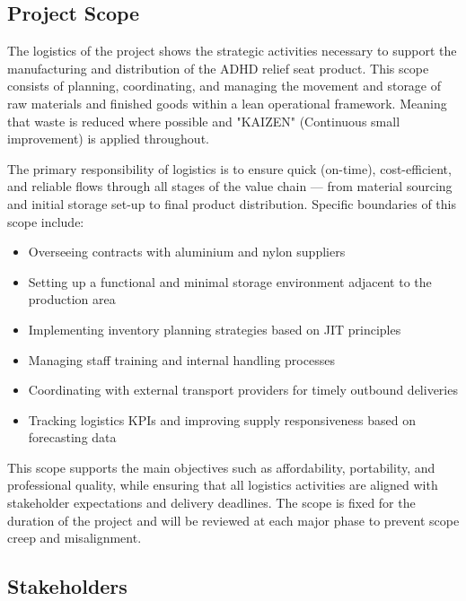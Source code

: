 \subsection{Project Scope}

The logistics of the project shows the strategic activities necessary to support the manufacturing and distribution of the ADHD relief seat product. This scope consists of planning, coordinating, and managing the movement and storage of raw materials and finished goods within a lean operational framework. Meaning that waste is reduced where possible and "KAIZEN" (Continuous small improvement) is applied throughout.

The primary responsibility of logistics is to ensure quick (on-time), cost-efficient, and reliable flows through all stages of the value chain — from material sourcing and initial storage set-up to final product distribution. Specific boundaries of this scope include:

\begin{itemize}[noitemsep]
  \item Overseeing contracts with aluminium and nylon suppliers
  \item Setting up a functional and minimal storage environment adjacent to the production area
  \item Implementing inventory planning strategies based on JIT principles
  \item Managing staff training and internal handling processes
  \item Coordinating with external transport providers for timely outbound deliveries
  \item Tracking logistics KPIs and improving supply responsiveness based on forecasting data
\end{itemize}

This scope supports the main objectives such as affordability, portability, and professional quality, while ensuring that all logistics activities are aligned with stakeholder expectations and delivery deadlines. The scope is fixed for the duration of the project and will be reviewed at each major phase to prevent scope creep and misalignment.

\subsection{Stakeholders}


